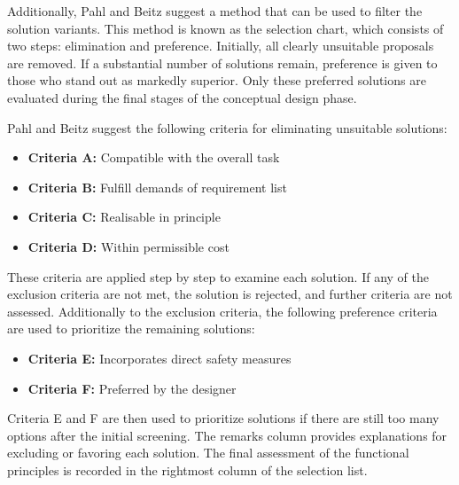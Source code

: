 Additionally, Pahl and Beitz \cite[107]{Pahl2007} suggest a method that can be used to filter the solution variants. This method is known as the selection chart, which consists of two steps: elimination and preference. Initially, all clearly unsuitable proposals are removed. If a substantial number of solutions remain, preference is given to those who stand out as markedly superior. Only these preferred solutions are evaluated during the final stages of the conceptual design phase.

Pahl and Beitz suggest the following criteria for eliminating unsuitable solutions:
\begin{itemize}
    \item \textbf{Criteria A:} Compatible with the overall task
    \item \textbf{Criteria B:} Fulfill demands of requirement list
    \item \textbf{Criteria C:} Realisable in principle
    \item \textbf{Criteria D:} Within permissible cost
\end{itemize}

These criteria are applied step by step to examine each solution. If any of the exclusion criteria are not met, the solution is rejected, and further criteria are not assessed. Additionally to the exclusion criteria, the following preference criteria are used to prioritize the remaining solutions:

\begin{itemize}
    \item \textbf{Criteria E:} Incorporates direct safety measures
    \item \textbf{Criteria F:} Preferred by the designer
\end{itemize}

Criteria E and F are then used to prioritize solutions if there are still too many options after the initial screening. The remarks column provides explanations for excluding or favoring each solution. The final assessment of the functional principles is recorded in the rightmost column of the selection list.

